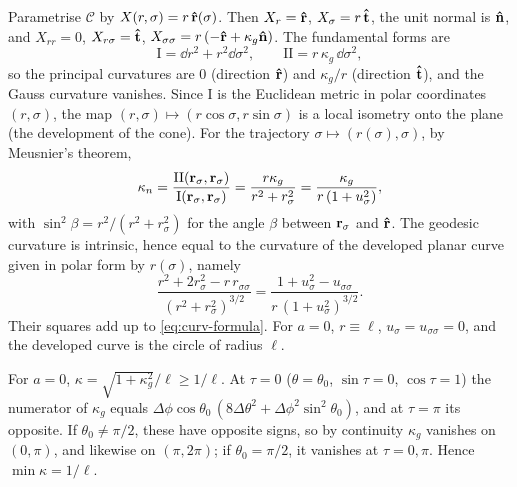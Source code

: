 Parametrise \(\mathscr C\) by \(X(r,\sigma) = r\,\vu r(\sigma)\).
Then \(X_r = \vu r\), \(X_\sigma = r\,\vu t\), the unit normal is \(\vu n\), and \(X_{rr} = 0\), \(X_{r\sigma} = \vu t\), \(X_{\sigma\sigma} = r\,(-\vu r + \kappa_g\vu n)\).
The fundamental forms are
\begin{equation}
    \mathrm{I} = \dd r^2 + r^2\dd\sigma^2, \qquad \mathrm{II} = r\,\kappa_g\,\dd\sigma^2,
\end{equation}
so the principal curvatures are \(0\) (direction \(\vu r\)) and \(\kappa_g/r\) (direction \(\vu t\)), and the Gauss curvature vanishes.
Since \(\mathrm I\) is the Euclidean metric in polar coordinates \((r,\sigma)\), the map \((r,\sigma)\mapsto(r\cos\sigma, r\sin\sigma)\) is a local isometry onto the plane (the development of the cone).
For the trajectory \(\sigma\mapsto(r(\sigma),\sigma)\), by Meusnier's theorem,
\begin{equation}
    \kappa_n = \frac{\mathrm{II}(\vb r_\sigma,\vb r_\sigma)}{\mathrm{I}(\vb r_\sigma,\vb r_\sigma)} = \frac{r\kappa_g}{r^2 + r_\sigma^2} = \frac{\kappa_g}{r\,(1+u_\sigma^2)},
\end{equation}
with \(\sin^2\beta = r^2/(r^2+r_\sigma^2)\) for the angle \(\beta\) between \(\vb r_\sigma\) and \(\vu r\).
The geodesic curvature is intrinsic, hence equal to the curvature of the developed planar curve given in polar form by \(r(\sigma)\), namely
\begin{equation}
    \frac{r^2 + 2r_\sigma^2 - r\,r_{\sigma\sigma}}{(r^2+r_\sigma^2)^{3/2}} = \frac{1 + u_\sigma^2 - u_{\sigma\sigma}}{r\,(1+u_\sigma^2)^{3/2}}.
\end{equation}
Their squares add up to \eqref{eq:curv-formula}.
For \(a=0\), \(r\equiv\ell\), \(u_\sigma = u_{\sigma\sigma} = 0\), and the developed curve is the circle of radius \(\ell\).

For \(a=0\), \(\kappa = \sqrt{1+\kappa_g^2}/\ell \ge 1/\ell\).
At \(\tau=0\) (\(\theta = \theta_0\), \(\sin\tau=0\), \(\cos\tau=1\)) the numerator of \(\kappa_g\) equals \(\Delta\phi\cos\theta_0\,(8\Delta\theta^2 + \Delta\phi^2\sin^2\theta_0)\), and at \(\tau=\pi\) its opposite.
If \(\theta_0\ne\pi/2\), these have opposite signs, so by continuity \(\kappa_g\) vanishes on \((0,\pi)\), and likewise on \((\pi,2\pi)\); if \(\theta_0 = \pi/2\), it vanishes at \(\tau = 0,\pi\).
Hence \(\min\kappa = 1/\ell\).

